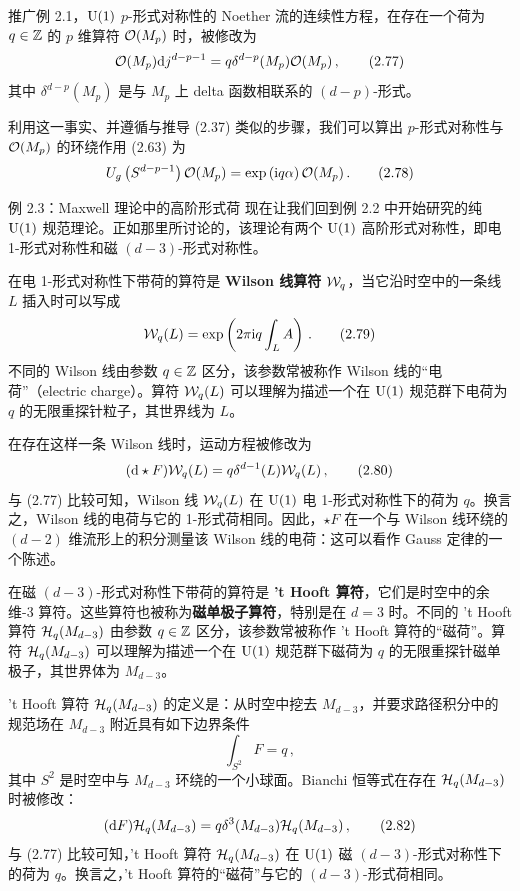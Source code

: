  推广例 2.1，$\mathrm{U}(1)$ $p$-形式对称性的 Noether 流的连续性方程，在存在一个荷为 $q\in\mathbb{Z}$ 的 $p$ 维算符 $\mathcal{O}(M_p)$ 时，被修改为
\begin{equation}
  \mathcal{O}(M_p)\mathrm{d} j^{d-p-1} = q\delta^{d-p}(M_p)\mathcal{O}(M_p)\,, \tag{2.77}
\end{equation}
其中 $\delta^{d-p}(M_p)$ 是与 $M_p$ 上 delta 函数相联系的 $(d-p)$-形式。

利用这一事实、并遵循与推导 (2.37) 类似的步骤，我们可以算出 $p$-形式对称性与 $\mathcal{O}(M_p)$ 的环绕作用 (2.63) 为
\begin{equation}
  U_g\left(S^{d-p-1}\right)\mathcal{O}(M_p) = \exp\left(\mathrm{i} q\alpha\right)\mathcal{O}(M_p)\,. \tag{2.78}
\end{equation}

\begin{examplebox}{例 2.3：Maxwell 理论中的高阶形式荷}
现在让我们回到例 2.2 中开始研究的纯 $\mathrm{U}(1)$ 规范理论。正如那里所讨论的，该理论有两个 $\mathrm{U}(1)$ 高阶形式对称性，即电 1-形式对称性和磁 $(d-3)$-形式对称性。

在电 1-形式对称性下带荷的算符是 \textbf{Wilson 线算符} $\mathcal{W}_q$，当它沿时空中的一条线 $L$ 插入时可以写成
\begin{equation}
  \mathcal{W}_q(L) = \exp\left(2\pi\mathrm{i} q\int_L A\right)\,. \tag{2.79}
\end{equation}
不同的 Wilson 线由参数 $q\in\mathbb{Z}$ 区分，该参数常被称作 Wilson 线的“电荷”（electric charge）。算符 $\mathcal{W}_q(L)$ 可以理解为描述一个在 $\mathrm{U}(1)$ 规范群下电荷为 $q$ 的无限重探针粒子，其世界线为 $L$。

在存在这样一条 Wilson 线时，运动方程被修改为
\begin{equation}
  (\mathrm{d}\star F)\mathcal{W}_q(L) = q\delta^{d-1}(L)\mathcal{W}_q(L)\,, \tag{2.80}
\end{equation}
与 (2.77) 比较可知，Wilson 线 $\mathcal{W}_q(L)$ 在 $\mathrm{U}(1)$ 电 1-形式对称性下的荷为 $q$。换言之，Wilson 线的电荷与它的 1-形式荷相同。因此，$\star F$ 在一个与 Wilson 线环绕的 $(d-2)$ 维流形上的积分测量该 Wilson 线的电荷：这可以看作 Gauss 定律的一个陈述。

在磁 $(d-3)$-形式对称性下带荷的算符是 \textbf{'t Hooft 算符}，它们是时空中的余维-3 算符。这些算符也被称为\textbf{磁单极子算符}，特别是在 $d=3$ 时。不同的 't Hooft 算符 $\mathcal{H}_q(M_{d-3})$ 由参数 $q\in\mathbb{Z}$ 区分，该参数常被称作 't Hooft 算符的“磁荷”。算符 $\mathcal{H}_q(M_{d-3})$ 可以理解为描述一个在 $\mathrm{U}(1)$ 规范群下磁荷为 $q$ 的无限重探针磁单极子，其世界体为 $M_{d-3}$。

't Hooft 算符 $\mathcal{H}_q(M_{d-3})$ 的定义是：从时空中挖去 $M_{d-3}$，并要求路径积分中的规范场在 $M_{d-3}$ 附近具有如下边界条件
\begin{equation}
  \int_{S^2} F = q\,, \tag{2.81}
\end{equation}
其中 $S^2$ 是时空中与 $M_{d-3}$ 环绕的一个小球面。Bianchi 恒等式在存在 $\mathcal{H}_q(M_{d-3})$ 时被修改：
\begin{equation}
  (\mathrm{d} F)\mathcal{H}_q(M_{d-3}) = q\delta^3(M_{d-3})\mathcal{H}_q(M_{d-3})\,, \tag{2.82}
\end{equation}
与 (2.77) 比较可知，'t Hooft 算符 $\mathcal{H}_q(M_{d-3})$ 在 $\mathrm{U}(1)$ 磁 $(d-3)$-形式对称性下的荷为 $q$。换言之，'t Hooft 算符的“磁荷”与它的 $(d-3)$-形式荷相同。
\end{examplebox}

